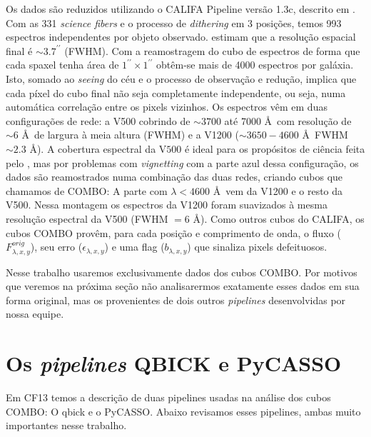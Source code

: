Os dados são reduzidos utilizando o CALIFA Pipeline versão 1.3c, descrito em \citet{Husemann2013}. Com as 331 {\em
science fibers} e o processo de {\em dithering} em 3 posições, temos 993 espectros independentes por objeto observado.
\citet{Husemann2013} estimam que a resolução espacial final é $\sim3.7^{\prime\prime}$ (FWHM). Com a reamostragem do
cubo de espectros de forma que cada spaxel tenha área de $1^{\prime\prime} \times 1^{\prime\prime}$ obtêm-se mais de
4000 espectros por galáxia. Isto, somado ao {\em seeing} do céu e o processo de observação e redução, implica que cada
píxel do cubo final não seja completamente independente, ou seja, numa automática correlação entre os pixels vizinhos.
Os espectros vêm em duas configurações de rede: a V500 cobrindo de $\sim 3700$ até 7000 \AA\ com resolução de $\sim 6$
\AA\ de largura à meia altura (FWHM) e a V1200 ($\sim 3650-4600$ \AA\ FWHM $\sim2.3$ \AA). A cobertura espectral da
V$500$ é ideal para os propósitos de ciência feita pelo \starlight, mas por problemas com {\em vignetting} com a parte
azul dessa configuração, os dados são reamostrados numa combinação das duas redes, criando cubos que chamamos de COMBO:
A parte com $\lambda < 4600$ \AA\ vem da V1200 e o resto da V500. Nessa montagem os espectros da V1200 foram suavizados
à mesma resolução espectral da V500 (FWHM $= 6$ \AA). Como outros cubos do CALIFA, os cubos COMBO provêm, para cada
posição e comprimento de onda, o fluxo ($F_{\lambda,x,y}^{orig}$), seu erro ($\epsilon_{\lambda,x,y}$) e uma flag
($b_{\lambda,x,y}$) que sinaliza pixels defeituosos.

Nesse trabalho usaremos exclusivamente dados dos cubos COMBO. Por motivos que veremos na próxima seção não analisarermos
exatamente esses dados em sua forma original, mas os provenientes de dois outros {\em pipelines} desenvolvidas por nossa
equipe.


\section{Os {\em pipelines} QBICK e PyCASSO}
\label{sec:CALePyC:pipelines}

Em CF13 temos a descrição de duas pipelines usadas na análise dos cubos COMBO: O {\sc qbick} e o PyCASSO. Abaixo
revisamos esses pipelines, ambas muito importantes nesse trabalho.


